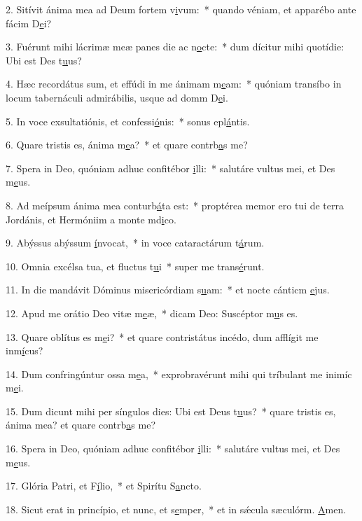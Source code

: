 2. Sitívit ánima mea ad Deum fortem v\uline{i}vum:~* quando véniam, et apparébo ante fácim D\uline{e}i?\par 
3. Fuérunt mihi lácrimæ meæ panes die ac n\uline{o}cte:~* dum dícitur mihi quotídie: Ubi est Des t\uline{u}us?\par 
4. Hæc recordátus sum, et effúdi in me ánimam m\uline{e}am:~* quóniam transíbo in locum tabernáculi admirábilis, usque ad domm D\uline{e}i.\par 
5. In voce exsultatiónis, et confessi\uline{ó}nis:~* sonus epl\uline{á}ntis.\par 
6. Quare tristis es, ánima m\uline{e}a?~* et quare contrb\uline{a}s me?\par 
7. Spera in Deo, quóniam adhuc confitébor \uline{i}lli:~* salutáre vultus mei, et Des m\uline{e}us.\par 
8. Ad meípsum ánima mea conturb\uline{á}ta est:~* proptérea memor ero tui de terra Jordánis, et Hermóniim a monte md\uline{i}co.\par 
9. Abýssus abýssum \uline{í}nvocat,~* in voce cataractárum t\uline{á}rum.\par 
10. Omnia excélsa tua, et fluctus t\uline{u}i~* super me trans\uline{é}runt.\par 
11. In die mandávit Dóminus misericórdiam s\uline{u}am:~* et nocte cánticm \uline{e}jus.\par 
12. Apud me orátio Deo vitæ m\uline{e}æ,~* dicam Deo: Suscéptor m\uline{u}s es.\par 
13. Quare oblítus es m\uline{e}i?~* et quare contristátus incédo, dum afflígit me inm\uline{í}cus?\par 
14. Dum confringúntur ossa m\uline{e}a,~* exprobravérunt mihi qui tríbulant me inimíc m\uline{e}i.\par 
15. Dum dicunt mihi per síngulos dies: Ubi est Deus t\uline{u}us?~* quare tristis es, ánima mea? et quare contrb\uline{a}s me?\par 
16. Spera in Deo, quóniam adhuc confitébor \uline{i}lli:~* salutáre vultus mei, et Des m\uline{e}us.\par 
17. Glória Patri, et F\uline{í}lio,~* et Spirítu S\uline{a}ncto.\par 
18. Sicut erat in princípio, et nunc, et s\uline{e}mper,~* et in sǽcula sæculórm. \uline{A}men.\par 
